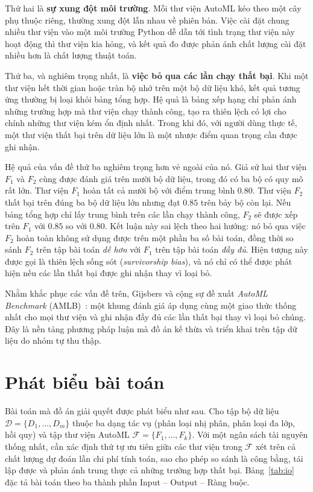 Thứ hai là \textbf{sự xung đột môi trường}. Mỗi thư viện AutoML kéo theo một cây
phụ thuộc riêng, thường xung đột lẫn nhau về phiên bản. Việc cài đặt chung nhiều
thư viện vào một môi trường Python dễ dẫn tới tình trạng thư viện này hoạt động
thì thư viện kia hỏng, và kết quả đo được phản ánh chất lượng cài đặt nhiều hơn
là chất lượng thuật toán.

Thứ ba, và nghiêm trọng nhất, là \textbf{việc bỏ qua các lần chạy thất bại}. Khi
một thư viện hết thời gian hoặc tràn bộ nhớ trên một bộ dữ liệu khó, kết quả
tương ứng thường bị loại khỏi bảng tổng hợp. Hệ quả là bảng xếp hạng chỉ phản ánh
những trường hợp mà thư viện chạy thành công, tạo ra thiên lệch có lợi cho chính
những thư viện kém ổn định nhất. Trong khi đó, với người dùng thực tế, một thư
viện thất bại trên dữ liệu lớn là một nhược điểm quan trọng cần được ghi nhận.

Hệ quả của vấn đề thứ ba nghiêm trọng hơn vẻ ngoài của nó. Giả
sử hai thư viện $F_1$ và $F_2$ cùng được đánh giá trên mười bộ dữ liệu, trong đó
có ba bộ có quy mô rất lớn. Thư viện $F_1$ hoàn tất cả mười bộ với điểm trung bình
$0.80$. Thư viện $F_2$ thất bại trên đúng ba bộ dữ liệu lớn nhưng đạt $0.85$ trên
bảy bộ còn lại. Nếu bảng tổng hợp chỉ lấy trung bình trên các lần chạy thành công,
$F_2$ sẽ được xếp trên $F_1$ với $0.85$ so với $0.80$. Kết luận này sai lệch theo
hai hướng: nó bỏ qua việc $F_2$ hoàn toàn không sử dụng được trên một phần ba số
bài toán, đồng thời so sánh $F_2$ trên tập bài toán \emph{dễ hơn} với $F_1$ trên
tập bài toán \emph{đầy đủ}. Hiện tượng này được gọi là thiên lệch sống sót
(\textit{survivorship bias}), và nó chỉ có thể được phát hiện nếu các lần thất bại
được ghi nhận thay vì loại bỏ.

Nhằm khắc phục các vấn đề trên, Gijsbers và cộng sự đề xuất \textit{AutoML
Benchmark} (AMLB)~\cite{gijsbers2024amlb}: một khung đánh giá áp dụng cùng một
giao thức thống nhất cho mọi thư viện và ghi nhận đầy đủ các lần thất bại thay vì
loại bỏ chúng. Đây là nền tảng phương pháp luận mà đồ án kế thừa và triển khai
trên tập dữ liệu do nhóm tự thu thập.

\section{Phát biểu bài toán}
\label{sec:phatbieu}
Bài toán mà đồ án giải quyết được phát biểu như sau. Cho tập bộ dữ liệu
$\mathcal{D} = \{D_1, \dots, D_m\}$ thuộc ba dạng tác vụ (phân loại nhị phân,
phân loại đa lớp, hồi quy) và tập thư viện AutoML
$\mathcal{F} = \{F_1, \dots, F_k\}$. Với một ngân sách tài nguyên thống nhất, cần
xác định thứ tự ưu tiên giữa các thư viện trong $\mathcal{F}$ xét trên cả chất
lượng dự đoán lẫn chi phí tính toán, sao cho phép so sánh là công bằng, tái lập
được và phản ánh trung thực cả những trường hợp thất bại.
Bảng~\ref{tab:io} đặc tả bài toán theo ba thành phần Input -- Output -- Ràng buộc.

